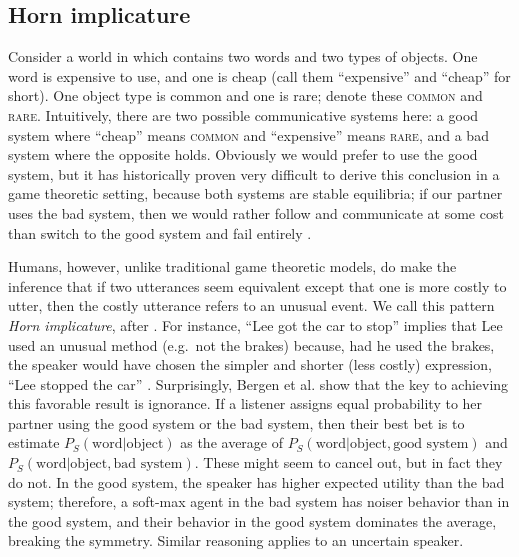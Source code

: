 \documentclass{article} %
\newcommand{\word}{\text{word}}
\newcommand{\obj}{\text{object}}
\begin{document}
%
%

\vspace{-2ex}

\subsection{Horn implicature}

\label{sec:horn-implicature}

Consider a world in which contains two words and two types of
objects. One word is expensive to use, and one is cheap (call them
``expensive'' and ``cheap'' for short). One object type is common and
one is rare; denote these \textsc{common} and
\textsc{rare}. Intuitively, there are two possible communicative
systems here: a good system where ``cheap'' means \textsc{common} and
``expensive'' means \textsc{rare}, and a bad system where the opposite
holds. Obviously we would prefer to use the good system, but it has
historically proven very difficult to derive this conclusion in a game
theoretic setting, because both systems are stable equilibria; if our
partner uses the bad system, then we would rather follow and
communicate at some cost than switch to the good system and fail
entirely \cite{bergen2012}.

Humans, however, unlike traditional game theoretic models, do make the
inference that if two utterances seem equivalent except that one is
more costly to utter, then the costly utterance refers to an unusual
event. We call this pattern \textit{Horn implicature}, after
\cite{horn1984}. For instance, ``Lee got the car to stop'' implies
that Lee used an unusual method (e.g.~not the brakes) because, had he
used the brakes, the speaker would have chosen the simpler and shorter
(less costly) expression, ``Lee stopped the car''
\cite{horn1984}. Surprisingly, Bergen et al. \cite{bergen2012} show
that the key to achieving this favorable result is ignorance. If a
listener assigns equal probability to her partner using the good
system or the bad system, then their best bet is to estimate
$P_S(\word | \obj)$ as the average of $P_S(\word | \obj, \text{good
  system})$ and $P_S(\word | \obj, \text{bad system})$. These might
seem to cancel out, but in fact they do not. In the good system, the
speaker has higher expected utility than the bad system; therefore, a
soft-max agent in the bad system has noiser behavior than in the good
system, and their behavior in the good system dominates the average,
breaking the symmetry. Similar reasoning applies to an uncertain
speaker.
\end{document}
